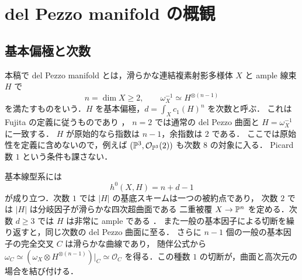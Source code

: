 \section{del Pezzo manifold の概観}
\label{sec:del-pezzo-review}

\subsection{基本偏極と次数}
本稿で del Pezzo manifold とは，滑らかな連結複素射影多様体 $X$ と
ample 線束 $H$ で
\[
 n=\dim X\geq2,\qquad \omega_X^{-1}\simeq H^{\otimes(n-1)}
\]
を満たすものをいう．$H$ を基本偏極，$d=\int_Xc_1(H)^n$ を次数と呼ぶ．
これは Fujita の定義に従うものであり
\cite[Theorem (1.9), Definition (1.13)]{Fujita1980}，
$n=2$ では通常の del Pezzo 曲面と $H=\omega_X^{-1}$ に一致する．
$H$ が原始的なら指数は $n-1$，余指数は $2$ である．
ここでは原始性を定義に含めないので，例えば
$(\mathbb P^3,\mathcal O_{\mathbb P^3}(2))$ も次数 $8$ の対象に入る．
Picard 数 $1$ という条件も課さない．

基本線型系には
\begin{equation}
 h^0(X,H)=n+d-1
 \label{eq:fundamental-sections}
\end{equation}
が成り立つ．次数 $1$ では $|H|$ の基底スキームは一つの被約点であり，
次数 $2$ では $|H|$ は分岐因子が滑らかな四次超曲面である
二重被覆 $X\to\mathbb P^n$ を定める．次数 $d\geq3$ では $H$ は非常に ample である
\cite[Lemma (1.10), Theorem (2.5)]{Fujita1980}
\cite[Proposition 2.2]{KP2023}．
また一般の基本因子による切断を繰り返すと，同じ次数の del Pezzo 曲面に至る．
さらに $n-1$ 個の一般の基本因子の完全交叉 $C$ は滑らかな曲線であり，
随伴公式から
$\omega_C\simeq(\omega_X\otimes H^{\otimes(n-1)})|_C\simeq\mathcal O_C$
を得る．この種数 $1$ の切断が，曲面と高次元の場合を結び付ける．


